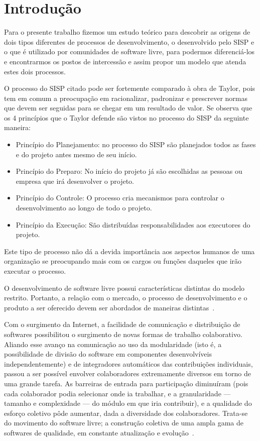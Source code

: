 \chapter{Introdução}

Para o presente trabalho fizemos um estudo teórico para descobrir as origens
de dois tipos diferentes de processos de desenvolvimento, o desenvolvido pelo 
SISP e o que é utilizado por comunidades de software livre, para podermos diferenciá-los
e encontrarmos os postos de intercessão e assim propor um modelo que atenda estes dois 
processos.

O processo do SISP citado pode ser fortemente comparado à obra de Taylor, pois 
tem em comum a preocupação em racionalizar, padronizar e prescrever normas que
devem ser seguidas para se chegar em um resultado de valor.
%
Se observa que os 4 princípios que o Taylor defende são vistos no processo do SISP
da seguinte maneira: 
\begin{itemize}
\item Princípio do Planejamento: no processo do SISP são planejados todos as fases
e do projeto antes mesmo de seu início.
\item Princípio do Preparo: No início do projeto já são escolhidas as pessoas 
ou empresa que irá desenvolver o projeto.
\item Princípio do Controle: O processo cria mecanismos para controlar o desenvolvimento
ao longo de todo o projeto.
\item Princípio da Execução: São distribuídas responsabilidades aos executores do projeto. 
\end{itemize}

Este tipo de processo não dá a devida importância aos aspectos humanos de uma organização
se preocupando mais com os cargos ou funções daqueles que irão executar o processo.

O desenvolvimento de software livre possui características distintas do modelo restrito. Portanto,
a relação com o mercado, o processo de desenvolvimento e o produto a ser oferecido devem ser
abordados de maneiras distintas~\cite{meirelles2013metrics}.

Com o surgimento da Internet, a facilidade de comunicação e distribuição de 
softwares possibilitou o surgimento de novas formas de trabalho colaborativo.
Aliando esse avanço na comunicação ao uso da modularidade (isto é, a possibilidade 
de divisão do software em componentes desenvolvíveis independentemente) e de 
integradores automáticos das contribuições individuais, passou a ser possível 
envolver colaboradores extremamente diversos em torno de uma grande tarefa. 
As barreiras de entrada para participação diminuíram (pois cada colaborador podia 
selecionar onde ia trabalhar, e a granularidade — tamanho e complexidade — do módulo 
em que iria contribuir), e a qualidade do esforço coletivo pôde aumentar, dada a 
diversidade dos colaboradores. Trata-se do movimento do software livre; 
a construção coletiva de uma ampla gama de softwares de qualidade, em constante 
atualização e evolução~\cite{simon2010rossio}.

